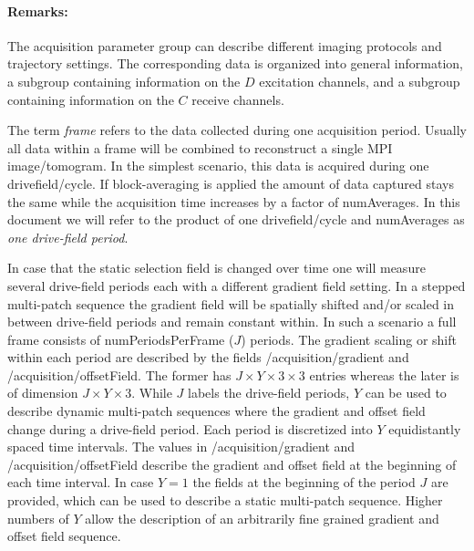 \documentclass[landscape,a4paper]{article} %
\newcommand{\inlvar}[1]{{\ttfamily#1}}
\begin{document}
\begin{multicols}{2}
\paragraph{Remarks:} The acquisition parameter group can describe different imaging protocols and trajectory settings. The corresponding data is organized into general information, a subgroup containing information on the $D$ excitation channels, and a subgroup containing information on the $C$ receive channels.

The term \textit{frame} refers to the data collected during one acquisition period. Usually all data within a frame will be combined to reconstruct a single MPI image/tomogram. In the simplest scenario, this data is acquired during one \inlvar{drivefield/cycle}. If block-averaging is applied the amount of data captured stays the same while the acquisition time increases by a factor of \inlvar{numAverages}. In this document we will refer to the product of one \inlvar{drivefield/cycle} and \inlvar{numAverages} as \textit{one drive-field period}.

In case that the static selection field is changed over time one will measure several drive-field periods each with a different gradient field setting. In a stepped multi-patch sequence the gradient field will be spatially shifted and/or scaled in between drive-field periods and remain constant within. In such a scenario a full frame consists of \inlvar{numPeriodsPerFrame} ($J$) periods. The gradient scaling or shift within each period are described by the fields \inlvar{/acquisition/gradient} and \inlvar{/acquisition/offsetField}. The former has $J \times Y \times 3 \times 3$ entries whereas the later is of dimension $J \times Y \times 3$. While $J$ labels the drive-field periods, $Y$ can be used to describe dynamic multi-patch sequences where the gradient and offset field change during a drive-field period. Each period is discretized into $Y$ equidistantly spaced time intervals. The values in \inlvar{/acquisition/gradient} and \inlvar{/acquisition/offsetField} describe the gradient and offset field at the beginning of each time interval. In case $Y=1$ the fields at the beginning of the period $J$ are provided, which can be used to describe a static multi-patch sequence. Higher numbers of $Y$ allow the description of an arbitrarily fine grained gradient and offset field sequence.


\end{multicols}
\end{document}
